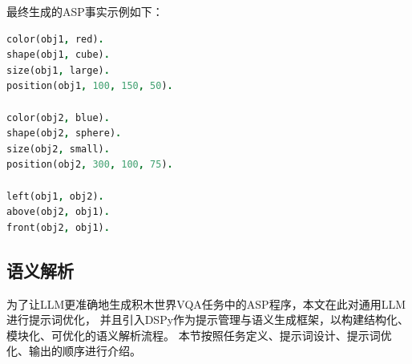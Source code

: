 最终生成的ASP事实示例如下： 
\begin{lstlisting}[language=Prolog] 
color(obj1, red). 
shape(obj1, cube). 
size(obj1, large). 
position(obj1, 100, 150, 50).

color(obj2, blue). 
shape(obj2, sphere). 
size(obj2, small). 
position(obj2, 300, 100, 75).

left(obj1, obj2). 
above(obj2, obj1). 
front(obj2, obj1). 
\end{lstlisting}
\subsection{语义解析}
为了让LLM更准确地生成积木世界VQA任务中的ASP程序，本文在此对通用LLM进行提示词优化，
并且引入DSPy作为提示管理与语义生成框架，以构建结构化、模块化、可优化的语义解析流程。
本节按照任务定义、提示词设计、提示词优化、输出的顺序进行介绍。

